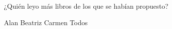  ¿Quién leyo m\'as libros de los que se hab\'ian propuesto?

\begin{oneparchoices}\footnotesize
    \CorrectChoice Alan
    \choice Beatriz
    \choice Carmen
    \choice Todos
\end{oneparchoices}